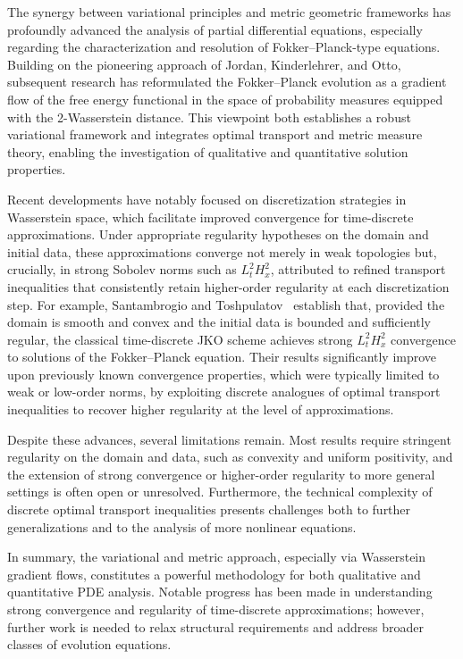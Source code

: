 \documentclass[sigconf]{acmart}
\begin{document}
The synergy between variational principles and metric geometric frameworks has profoundly advanced the analysis of partial differential equations, especially regarding the characterization and resolution of Fokker–Planck-type equations. Building on the pioneering approach of Jordan, Kinderlehrer, and Otto, subsequent research has reformulated the Fokker–Planck evolution as a gradient flow of the free energy functional in the space of probability measures equipped with the 2-Wasserstein distance. This viewpoint both establishes a robust variational framework and integrates optimal transport and metric measure theory, enabling the investigation of qualitative and quantitative solution properties.

Recent developments have notably focused on discretization strategies in Wasserstein space, which facilitate improved convergence for time-discrete approximations. Under appropriate regularity hypotheses on the domain and initial data, these approximations converge not merely in weak topologies but, crucially, in strong Sobolev norms such as $L^2_t H^2_x$, attributed to refined transport inequalities that consistently retain higher-order regularity at each discretization step. For example, Santambrogio and Toshpulatov~\cite{ref96} establish that, provided the domain is smooth and convex and the initial data is bounded and sufficiently regular, the classical time-discrete JKO scheme achieves strong $L^2_t H^2_x$ convergence to solutions of the Fokker--Planck equation. Their results significantly improve upon previously known convergence properties, which were typically limited to weak or low-order norms, by exploiting discrete analogues of optimal transport inequalities to recover higher regularity at the level of approximations.

Despite these advances, several limitations remain. Most results require stringent regularity on the domain and data, such as convexity and uniform positivity, and the extension of strong convergence or higher-order regularity to more general settings is often open or unresolved. Furthermore, the technical complexity of discrete optimal transport inequalities presents challenges both to further generalizations and to the analysis of more nonlinear equations.

In summary, the variational and metric approach, especially via Wasserstein gradient flows, constitutes a powerful methodology for both qualitative and quantitative PDE analysis. Notable progress has been made in understanding strong convergence and regularity of time-discrete approximations; however, further work is needed to relax structural requirements and address broader classes of evolution equations.
\end{document}
